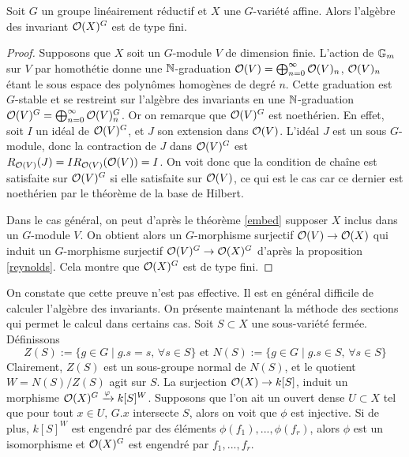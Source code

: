 \begin{thm}[Hilbert]\label{hilbert}
Soit $G$ un groupe linéairement réductif et $X$ une $G$-variété affine. Alors l'algèbre des invariant $\mathcal{O}(X)^G$ est de type fini.
\end{thm}
\begin{proof}
Supposons que $X$ soit un $G$-module $V$ de dimension finie. L'action de $\mathbb{G}_m$ sur $V$ par homothétie donne une $\mathbb{N}$-graduation $\mathcal{O}(V)=\bigoplus_{n=0}^{\infty}\mathcal{O}(V)_n$, $\mathcal{O}(V)_n$ étant le sous espace des polynômes homogènes de degré $n$. Cette graduation est $G$-stable et se restreint sur l'algèbre des invariants en une $\mathbb{N}$-graduation $\mathcal{O}(V)^G=\bigoplus_{n=0}^{\infty}\mathcal{O}(V)^G_n$. Or on remarque que $\mathcal{O}(V)^G$ est noethérien. En effet, soit $I$ un idéal de $\mathcal{O}(V)^G$, et $J$ son extension dans $\mathcal{O}(V)$. L'idéal $J$ est un sous $G$-module, donc la contraction de $J$ dans $\mathcal{O}(V)^G$ est $R_{\mathcal{O}(V)}(J)=IR_{\mathcal{O}(V)}(\mathcal{O}(V))=I$. On voit donc que la condition de chaîne est satisfaite sur $\mathcal{O}(V)^G$ si elle satisfaite sur $\mathcal{O}(V)$, ce qui est le cas car ce dernier est noethérien par le théorème de la base de Hilbert. 

Dans le cas général, on peut d'après le théorème \ref{embed} supposer $X$ inclus dans un $G$-module $V$. On obtient alors un $G$-morphisme surjectif $\mathcal{O}(V) \rightarrow \mathcal{O}(X)$ qui induit un $G$-morphisme surjectif $\mathcal{O}(V)^G \rightarrow \mathcal{O}(X)^G$ d'après la proposition \ref{reynolds}. Cela montre que $\mathcal{O}(X)^G$ est de type fini.
\end{proof}

On constate que cette preuve n'est pas effective. Il est en général difficile de calculer l'algèbre des invariants. On présente maintenant la méthode des sections qui permet le calcul dans certains cas. Soit $S\subset X$ une sous-variété fermée. Définissons 
$$Z(S):=\lbrace g\in G\mid g.s=s,\,\forall s \in S\rbrace\text{ et }N(S):=\lbrace g\in G\mid g.s\in S,\,\forall s \in S\rbrace$$
Clairement, $Z(S)$ est un sous-groupe normal de $N(S)$, et le quotient $W=N(S)/Z(S)$ agit sur $S$. La surjection $\mathcal{O}(X)\rightarrow k[S]$, induit un morphisme $\mathcal{O}(X)^G\xrightarrow{\varphi} k[S]^W$. Supposons que l'on ait un ouvert dense $U\subset X$ tel que pour tout $x\in U,\, G.x$ intersecte $S$, alors on voit que $\phi$ est injective. Si de plus, $k[S]^W$ est engendré par des éléments $\phi(f_1),...,\phi(f_r)$, alors $\phi$ est un isomorphisme et $\mathcal{O}(X)^G$ est engendré par $f_1,...,f_r$.

